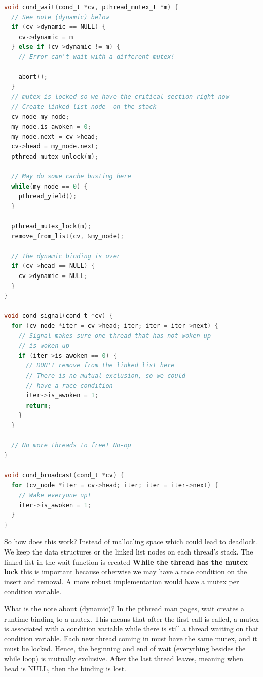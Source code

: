 \begin{lstlisting}[language=C]
void cond_wait(cond_t *cv, pthread_mutex_t *m) {
  // See note (dynamic) below
  if (cv->dynamic == NULL) {
    cv->dynamic = m
  } else if (cv->dynamic != m) {
    // Error can't wait with a different mutex!

    abort();
  }
  // mutex is locked so we have the critical section right now
  // Create linked list node _on the stack_
  cv_node my_node;
  my_node.is_awoken = 0;
  my_node.next = cv->head;
  cv->head = my_node.next;
  pthread_mutex_unlock(m);

  // May do some cache busting here
  while(my_node == 0) {
    pthread_yield();
  }

  pthread_mutex_lock(m);
  remove_from_list(cv, &my_node);

  // The dynamic binding is over
  if (cv->head == NULL) {
    cv->dynamic = NULL;
  }
}

void cond_signal(cond_t *cv) {
  for (cv_node *iter = cv->head; iter; iter = iter->next) {
    // Signal makes sure one thread that has not woken up
    // is woken up
    if (iter->is_awoken == 0) {
      // DON'T remove from the linked list here
      // There is no mutual exclusion, so we could
      // have a race condition
      iter->is_awoken = 1;
      return;
    }
  }

  // No more threads to free! No-op
}

void cond_broadcast(cond_t *cv) {
  for (cv_node *iter = cv->head; iter; iter = iter->next) {
    // Wake everyone up!
    iter->is_awoken = 1;
  }
}
\end{lstlisting}

So how does this work?
Instead of malloc'ing space which could lead to deadlock.
We keep the data structures or the linked list nodes on each thread's stack.
The linked list in the wait function is created \textbf{While the thread has the mutex lock} this is important because otherwise we may have a race condition on the insert and removal.
A more robust implementation would have a mutex per condition variable.

What is the note about (dynamic)?
In the pthread man pages, wait creates a runtime binding to a mutex. This means that after the first call is called, a mutex is associated with a condition variable while there is still a thread waiting on that condition variable.
Each new thread coming in must have the same mutex, and it must be locked.
Hence, the beginning and end of wait (everything besides the while loop) is mutually exclusive.
After the last thread leaves, meaning when head is NULL, then the binding is lost.

